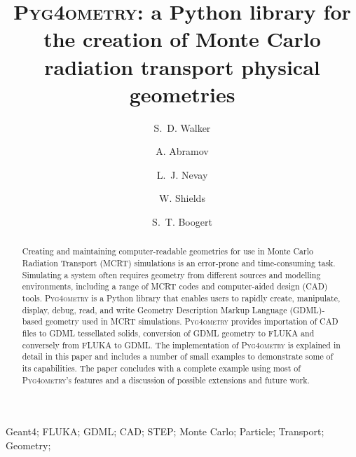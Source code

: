 \documentclass[final,5p,times,twocolumn]{elsarticle}
\newcommand{\PYGEOMETRY}{\textsc{Pyg4ometry}}
\newcommand{\PYGEOMETRYPOS}{\textsc{Pyg4ometry's}} %
\begin{document}
\begin{frontmatter}



\title{\PYGEOMETRY{}: a Python library for the creation of Monte Carlo radiation transport physical geometries}


\author[a]{S.~D. Walker}
\author[a]{A. Abramov}
\author[a]{L.~J. Nevay}
\author[a]{W. Shields}
\author[a]{S.~T. Boogert}

\address[a]{John Adams Institute at Royal Holloway, Department of Physics, Royal Holloway, Egham, TW20 0EX, Surrey, UK}

\begin{abstract}
Creating and maintaining computer-readable geometries for use in Monte Carlo Radiation Transport (MCRT) simulations is an
error-prone and time-consuming task. Simulating a system often requires geometry from different sources and modelling
environments, including a range of MCRT codes and computer-aided design (CAD) tools. \PYGEOMETRY{} is a Python library
that enables users to rapidly create, manipulate, display, debug, read, and write Geometry Description Markup Language (GDML)-based
geometry used in MCRT simulations. \PYGEOMETRY{} provides importation of CAD files to GDML tessellated solids, conversion of GDML geometry
to FLUKA and conversely from FLUKA to GDML. The implementation of \PYGEOMETRY{} is explained in detail in this paper and includes a number of small
examples to demonstrate some of its capabilities. The paper concludes with a complete example using most of \PYGEOMETRYPOS{} features and a discussion of possible
extensions and future work.
\end{abstract}

\begin{keyword}
Geant4; FLUKA; GDML; CAD; STEP; Monte Carlo; Particle; Transport; Geometry;

\end{keyword}

\end{frontmatter}
\end{document}
